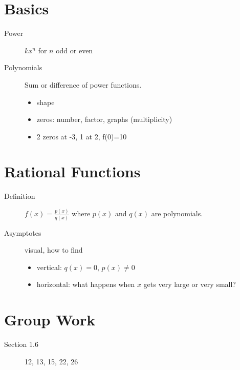 \documentclass[11pt]{article}
\begin{document}
\drawtitle

\section*{Basics}
\begin{description}
\item[Power] $kx^n$ for $n$ odd or even
\item[Polynomials] Sum or difference of power functions.
  \begin{itemize}
  \item shape
  \item zeros: number, factor, graphs (multiplicity)
  \item 2 zeros at -3, 1 at 2, f(0)=10
  \end{itemize}
\end{description}

\section*{Rational Functions}
\begin{description}
\item[Definition] $\displaystyle f(x)=\frac{p(x)}{q(x)}$ where $p(x)$
  and $q(x)$ are polynomials.
\item[Asymptotes] visual, how to find
  \begin{itemize}
  \item vertical: $q(x)=0$, $p(x)\neq 0$
  \item horizontal: what happens when $x$ gets very large or very
    small?
  \end{itemize}
\end{description}

\section*{Group Work}
\begin{description}
\item[Section 1.6] 12, 13, 15, 22, 26
\end{description}
\end{document}

